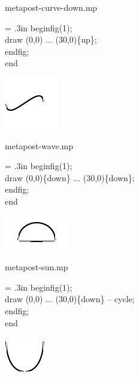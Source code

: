 \documentclass[danish,a2paper,22pt]{scrartcl}
\begin{document}
\begin{multicols*}{3}
\begin{spacing}{0.5}
\flushleft
\color{White}
\romansmall
metapost-curve-down.mp\\
\vspace{.4cm}
\color{Black}
\typewritersmall
{\leftskip = .3in
beginfig(1);\\
draw (0,0) ... (30,0)\fontsize{15pt}{40pt}\{up\};\\
endfig;\\
end
\par}
\vspace{1.5cm}

\center
\includegraphics[scale=5]{metapoints/metapoints-4.pdf}
\vspace{1cm}

\flushleft
\color{White}
\romansmall
metapost-wave.mp\\
\vspace{.4cm}
\color{Black}
\typewritersmall
{\leftskip = .3in
beginfig(1);\\
draw (0,0)\fontsize{15pt}{40pt}\{down\} ... (30,0)\fontsize{15pt}{40pt}\{down\};\\
endfig;\\
end
\par}
\vspace{1.5cm}

\columnbreak

\center
\includegraphics[scale=5]{metapoints/metapoints-5.pdf}
\vspace{1.5cm}

\flushleft
\color{White}
\romansmall
metapost-sun.mp\\
\vspace{.4cm}
\color{Black}
\typewritersmall
{\leftskip = .3in
beginfig(1);\\
draw (0,0) ... (30,0)\fontsize{15pt}{40pt}\{down\} -- cycle;\\
endfig;\\
end
\par}
\vspace{1.5cm}

\center
\includegraphics[scale=5]{metapoints/metapoints-6.pdf}
\vspace{1.5cm}


\end{spacing}
\end{multicols*}
\end{document}
